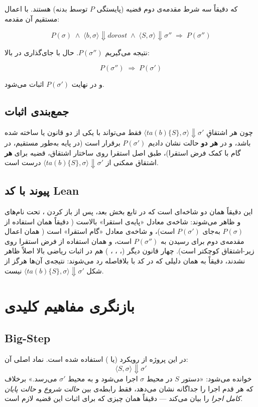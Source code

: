 \documentclass[12pt]{report}
\begin{document}
	که دقیقاً سه شرط مقدمه‌ی دوم قضیه (پایستگی $P$ توسط بدنه) هستند. با اعمال مستقیم آن مقدمه:
	
	\[
	P(\sigma) \;\land\; \langle b,\sigma\rangle{\Downarrow}\mathit{dorost} \;\land\; \langle S,\sigma\rangle{\Downarrow}\sigma'' \;\Rightarrow\; P(\sigma'')
	\]
	
	نتیجه می‌گیریم $P(\sigma'')$. حال با جای‌گذاری در  بالا:
	
	\[
	P(\sigma'') \;\Rightarrow\; P(\sigma')
	\]
	
	و در نهایت $P(\sigma')$ اثبات می‌شود.
	
	\subsection{جمع‌بندی اثبات}
	
	چون هر اشتقاقِ $\langle \mathit{ta}(b)\{S\},\sigma\rangle \Downarrow \sigma'$ فقط می‌تواند با یکی از دو قانون  یا  ساخته شده باشد، و در \textbf{هر دو} حالت نشان دادیم $P(\sigma')$ برقرار است (در پایه به‌طور مستقیم، در گام با کمک فرض استقرا)، طبق اصل استقرا روی ساختار اشتقاق، قضیه برای \textbf{هر} اشتقاق ممکنی از $\langle \mathit{ta}(b)\{S\},\sigma\rangle \Downarrow \sigma'$ درست است. 
	
	\subsection*{پیوند با کد Lean}
	این دقیقاً همان دو شاخه‌ای است که در تابع  بخش بعد، پس از باز کردن ، تحت نام‌های  و  ظاهر می‌شوند: شاخه‌ی  معادل «پایه‌ی استقرا» بالاست ( دقیقاً همان استفاده از $P(\sigma)$ به‌جای $P(\sigma')$ است)، و شاخه‌ی  معادل «گام استقرا» است ( همان اعمال مقدمه‌ی دوم برای رسیدن به $P(\sigma'')$ است، و  همان استفاده از فرض استقرا  روی زیر\nobreakdash-اشتقاق کوچکتر است). چهار قانون دیگر (، ، ، ) هم در اثبات ریاضی بالا اصلاً ظاهر نشدند، دقیقاً به همان دلیلی که در کد  با  بلافاصله رد می‌شوند: نتیجه‌ی آن‌ها هرگز از شکل $\langle \mathit{ta}(b)\{S\},\sigma\rangle \Downarrow \sigma'$ نیست.
	
	\section{بازنگری مفاهیم کلیدی}
	
	\subsection{Big-Step}
	در این پروژه از رویکرد  (یا ) استفاده شده است. نماد اصلی آن:
	\[
	\langle S, \sigma \rangle \Downarrow \sigma'
	\]
	خوانده می‌شود: «دستور $S$ در محیط $\sigma$ اجرا می‌شود و به محیط $\sigma'$ می‌رسد.» برخلاف  که هر قدم اجرا را جداگانه نشان می‌دهد،  فقط رابطه‌ی بین \emph{حالت شروع} و \emph{حالت پایان کامل اجرا} را بیان می‌کند --- دقیقاً همان چیزی که برای اثبات این قضیه لازم است.
	
\end{document}
